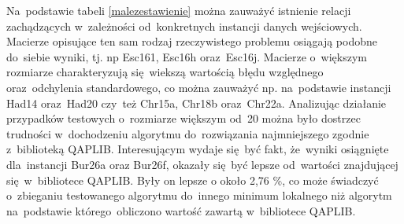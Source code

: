 Na~podstawie tabeli \ref{malezestawienie} można zauważyć istnienie relacji zachądzących w~zależności od~konkretnych instancji danych wejściowych. Macierze opisujące ten sam rodzaj rzeczywistego problemu osiągają podobne do~siebie wyniki, tj. np Esc161, Esc16h oraz~Esc16j. Macierze o~większym rozmiarze charakteryzują się~wiekszą wartością błędu względnego oraz~odchylenia standardowego, co można zauważyć np. na~podstawie instancji Had14 oraz~Had20 czy~też Chr15a, Chr18b oraz~Chr22a. Analizując działanie przypadków testowych o~rozmiarze większym od~20 można było dostrzec trudności w~dochodzeniu algorytmu do~rozwiązania najmniejszego zgodnie z~biblioteką QAPLIB. Interesującym wydaje się~być fakt, że~wyniki osiągnięte dla~instancji Bur26a oraz Bur26f, okazały się~być lepsze od~wartości znajdującej się~w~bibliotece QAPLIB. Były on lepsze o około 2,76 \%, co może świadczyć o~zbieganiu testowanego algorytmu do~innego minimum lokalnego niż algorytm na~podstawie którego~obliczono wartość zawartą w~bibliotece QAPLIB.





























